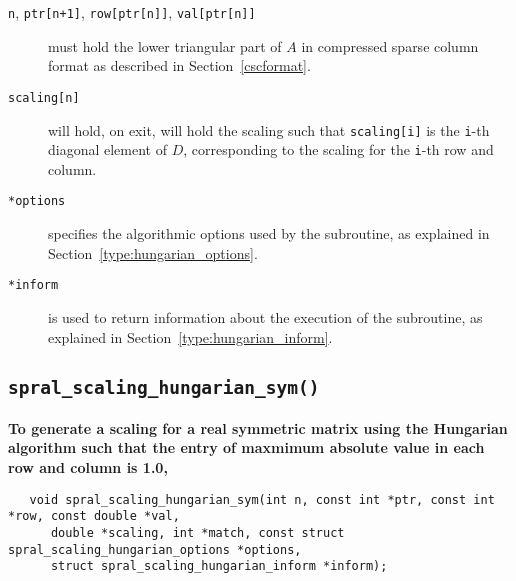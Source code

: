 \begin{description}

\item[\texttt{n}, \texttt{ptr[n+1]}, \texttt{row[ptr[n]]}, \texttt{val[ptr[n]]}] must hold the lower triangular part of $A$ in compressed sparse column format as described in Section~\ref{cscformat}.

\item[\texttt{scaling[n]}] will hold, on exit, will hold the scaling such that
\texttt{scaling[i]} is the \texttt{i}-th diagonal element of $D$,
corresponding to the scaling for the \texttt{i}-th row and column.

\item[\texttt{*options}] specifies the algorithmic options used by the subroutine, as explained in Section~\ref{type:hungarian_options}.

\item[\texttt{*inform}] is used to return information about the execution of the subroutine, as explained in Section~\ref{type:hungarian_inform}.


\end{description}



\subsection{\texttt{spral\_scaling\_hungarian\_sym()}}

\textbf{\noindent
   To generate a scaling for a real symmetric matrix using the Hungarian algorithm such that the entry of maxmimum absolute value in each row and column is 1.0,
}
\vspace*{-0.1cm}
\begin{verbatim}
   void spral_scaling_hungarian_sym(int n, const int *ptr, const int *row, const double *val,
      double *scaling, int *match, const struct spral_scaling_hungarian_options *options,
      struct spral_scaling_hungarian_inform *inform);
\end{verbatim}

